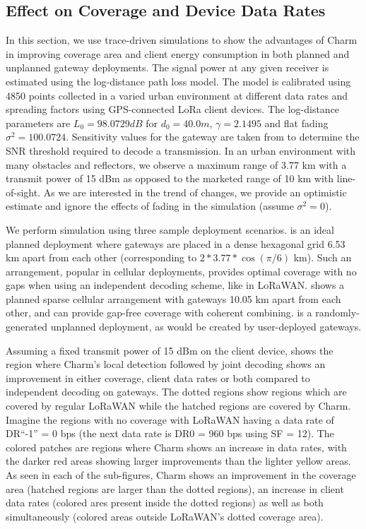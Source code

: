 \subsection{Effect on Coverage and Device Data Rates}
\label{sec:coverage-data-rate-improvement}

In this section, we use trace-driven simulations to show the advantages of
Charm in improving coverage area and client energy consumption in both planned
and unplanned gateway deployments. The signal power at any given receiver is
estimated using the log-distance path loss model. The model is calibrated
using 4850 points collected in a varied urban environment at different data
rates and spreading factors using GPS-connected LoRa client devices. The
log-distance parameters are $L_0  = 98.0729 dB$ for $d_0 = 40.0 m$, $\gamma =
2.1495$ and flat fading $\sigma^2 = 100.0724$. Sensitivity values for the
gateway are taken from \cite{Bor2016} to determine the SNR threshold required
to decode a transmission. In an urban environment with many obstacles and
reflectors, we observe a maximum range of 3.77 km with a transmit power of 15
dBm as opposed to the marketed range of 10 km with line-of-sight. As we are
interested in the trend of changes, we provide an optimistic estimate and
ignore the effects of fading in the simulation (assume $\sigma^2 = 0$).

We perform simulation using three sample deployment scenarios.
 is an ideal planned deployment where gateways
are placed in a dense hexagonal grid 6.53 km apart from each other
(corresponding to $2*3.77*\cos(\pi/6)$ km). Such an arrangement, popular in
cellular deployments, provides optimal coverage with no gaps when using an
independent decoding scheme, like in LoRaWAN. 
shows a planned sparse cellular arrangement with gateways 10.05 km apart from
each other, and can provide gap-free coverage with coherent combining.
 is a randomly-generated unplanned deployment, as
would be created by user-deployed gateways.

Assuming a fixed transmit power of 15 dBm on the client device,
 shows the region where Charm's local detection
followed by joint decoding shows an improvement in either coverage, client
data rates or both compared to independent decoding on gateways. The dotted
regions show regions which are covered by regular LoRaWAN while the hatched
regions are covered by Charm. Imagine the regions with no coverage with
LoRaWAN having a data rate of DR``-1'' = 0 bps (the next data rate is DR0 =
960 bps using SF = 12). The colored patches are regions where Charm shows an
increase in data rates, with the darker red areas showing larger improvements
than the lighter yellow areas. As seen in each of the sub-figures, Charm shows
an improvement in the coverage area (hatched regions are larger than the
dotted regions), an increase in client data rates (colored ares present inside
the dotted regions) as well as both simultaneously (colored areas outside
LoRaWAN's dotted coverage area).


